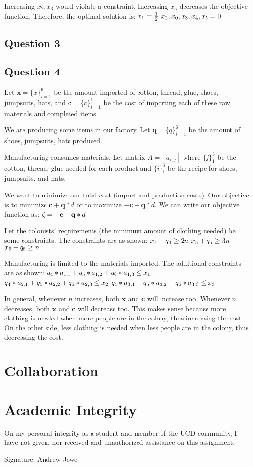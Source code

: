 \documentclass[17pt]{extarticle}
\begin{document}
\bigskip Increasing $x_2, x_3$ would violate a constraint. Increasing $x_5$ decreases the objective function. Therefore, the optimal solution is:
$\\x_1 = \frac{1}{2}$
$\\x_2, x_0, x_3, x_4, x_5 = 0$

\newpage
\subsection*{Question 3}

\newpage
\subsection*{Question 4}
Let $\textbf{x} = \{x\}_{i=1}^6$ be the amount imported of cotton, thread, glue, shoes, jumpsuits, hats, and $\textbf{c} = \{c\}_{i=1}^6$ be the cost of importing each of these raw materials and completed items.

\bigskip We are producing some items in our factory. Let $\textbf{q} = \{q\}_{i=4}^6$ be the amount of shoes, jumpsuits, hats produced.

\bigskip Manufacturing consumes materials. Let matrix $A = [a_{i,j}]$ where $\{j\}_1^3$ be the cotton, thread, glue needed for each product and $\{i\}_1^3$ be the recipe for shoes, jumpsuits, and hats.

\bigskip We want to minimize our total cost (import and production costs). Our objective is to minimize $\textbf{c}+\textbf{q}*d$ or to maximize $-\textbf{c}-\textbf{q}*d$. We can write our objective function as:
$\\\zeta = -\textbf{c}-\textbf{q}*d$

\bigskip Let the colonists' requirements (the minimum amount of clothing needed) be some constraints. The constraints are as shown:
$\\x_4 + q_4 \geq 2n$
$\\x_5 + q_5 \geq 3n$
$\\x_6 + q_6 \geq n$

\bigskip Manufacturing is limited to the materials imported. The additional constraints are as shown:
$\\q_4*a_{1,1} + q_5*a_{1,2} + q_6*a_{1,3} \leq x_1$
$\\q_4*a_{2,1} + q_5*a_{2,2} + q_6*a_{2,3} \leq x_2$
$\\q_4*a_{3,1} + q_5*a_{3,2} + q_6*a_{3,3} \leq x_3$

\bigskip In general, whenever $n$ increases, both $\textbf{x}$ and $\textbf{c}$ will increase too. Whenever $n$ decreases, both $\textbf{x}$ and $\textbf{c}$ will decrease too. This makes sense because more clothing is needed when more people are in the colony, thus increasing the cost. On the other side, less clothing is needed when less people are in the colony, thus decreasing the cost.

\newpage
\section*{Collaboration}

\newpage
\section*{Academic Integrity}
On my personal integrity as a student and member of the UCD community, I have not given, nor received and unauthorized assistance on this assignment.

Signature: Andrew Jowe
\end{document}
